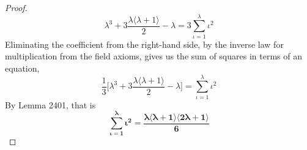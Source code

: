 \documentclass[preview]{standalone}
\begin{document}
\begin{proof}
    \begin{equation*}
        \lambda ^3 
            + 
        3 \frac{ \lambda \big \langle \lambda + 1 \big \rangle }
        {2} 
            - 
        \lambda 
            = 
        3 \sum_{\iota=1}^\lambda \iota ^2
    \end{equation*}
    Eliminating the coefficient  from the right-hand side, 
    by the inverse law for multiplication from the field axioms, 
    gives us the sum of squares in terms of an equation, 
    \begin{equation*}
        \frac{1}{3}
        \bigg[
            \lambda ^3 
                + 
            3 \frac{ \lambda \big \langle \lambda + 1 \big \rangle }
            {2} 
                - 
            \lambda
        \bigg]
            = 
        \sum_{\iota=1}^\lambda \iota ^2
    \end{equation*}
    By Lemma 2401, that is
    \begin{equation*}
        \bm{
            \sum_{\iota=1}^\lambda \iota ^2 
                = 
            \frac{ 
                \lambda \big \langle \lambda + 1 \big \rangle
                \big \langle 2 \lambda + 1 \big \rangle 
            }
            {6}
        }
    \end{equation*}
\color{lightgray} \end{proof}
\end{document}
